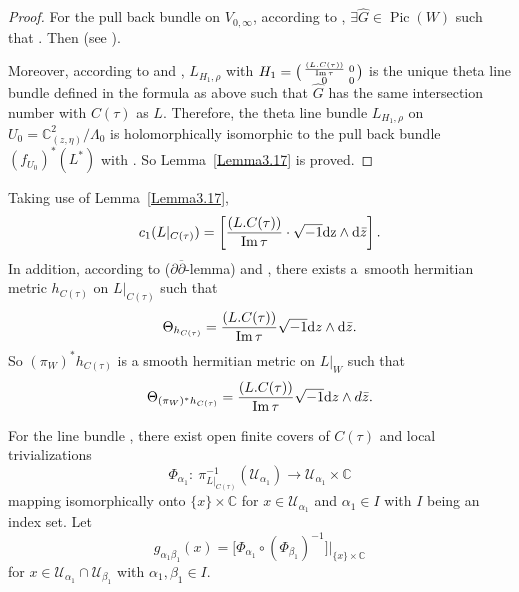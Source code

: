 \documentclass[pdftex]{sigma}
\numberwithin{equation}{section}
\begin{document}
\begin{proof}
For the pull back bundle  on $V_{0,\infty}$, according to \cite[Proposition~3.5]{Takayuki-Takato2}, $\exists \hat{G} \in \operatorname{Pic}(W) $ such that . Then  (see \cite[Lemma~3.4]{Takayuki-Takato2}).

Moreover, according to \cite[Lemma~3.4]{Takayuki-Takato2} and \cite[Proposition~3.5]{Takayuki-Takato2}, $L_{H_1,\rho}$ with $H_1=\smash{\bigl(\begin{smallmatrix}
\frac{(L.C(\tau))}{\operatorname{ Im}\tau} & 0\\
0&0
\end{smallmatrix}\bigr)}$ is the unique theta line bundle defined in the formula as above such that $\hat{G}$ has the same intersection number with $C(\tau)$ as $L$. Therefore, the theta line bundle $L_{H_1, \rho}$ on $U_0=\mathbb{C}^2_{(z,\eta)}/{\Lambda_0}$ is holomorphically isomorphic to the pull back bundle $(f_{U_0})^*(L^*)$ with . So Lemma~\ref{Lemma3.17} is proved.
\end{proof}


Taking use of Lemma~\ref{Lemma3.17},
\[
c_1(L|_{C(\tau)})=\left[\frac{(L.C(\tau))}{\operatorname{Im}\tau}\cdot \sqrt{-1}\text{{\rm d}z}\land {\rm d}\bar{z}\right].
\]
In addition, according to \cite[Lemma~7.31]{Vincent-Ahmed} ($\partial \overline{\partial}$-lemma) and \cite[Section 8.2]{Vincent-Ahmed}, there exists a~smooth hermitian metric $h_{C(\tau)}$ on $L|_{C(\tau)}$ such that
\[
\Theta_{h_{C(\tau)}} = \frac{(L.C(\tau))}{\operatorname{ Im}\tau} \sqrt{-1} {\rm d}z \wedge {\rm d} \bar{z}.
\]
 So $(\pi_W)^*h_{C(\tau)}$ is a smooth hermitian metric on $L|_W$ such that
\[
\Theta_{(\pi_W)^*h_{C(\tau)}}=\frac{(L.C(\tau))}{\operatorname{Im}\tau} \sqrt{-1} {\rm d}z \wedge d \bar{z}.
\]

For the line bundle , there exist open finite covers  of $C(\tau)$ and local trivializations
\[
\Phi_{\alpha_1}\colon \ \pi^{-1}_{L|_{C(\tau)}}(\mathcal{U}_{\alpha_1}) \rightarrow \mathcal{U}_{\alpha_1} \times \mathbb{C}
\]
 mapping  isomorphically onto $ \{ x \} \times \mathbb{C}$ for $x \in \mathcal{U}_{\alpha_1}$ and $\alpha_1 \in I$ with $I$ being an index set. Let
\[
g_{\alpha_1 \beta_1}(x)=\big[\Phi_{\alpha_1} \circ (\Phi_{\beta_1})^{-1}\big]|_{ \{ x \} \times \mathbb{C}}
\]
for $ x \in \mathcal{U}_{\alpha_1} \cap \mathcal{U}_{\beta_1}$ with $\alpha_1, \beta_1 \in I$.
\end{document}
